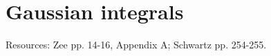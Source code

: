 \documentclass[12pt, oneside]{article}   	%
\theoremstyle{definition}
\begin{document}
\begin{itemize}
	

\end{itemize}

\section*{Gaussian integrals}

Resources: Zee pp. 14-16, Appendix A; Schwartz pp. 254-255.
\end{document}
